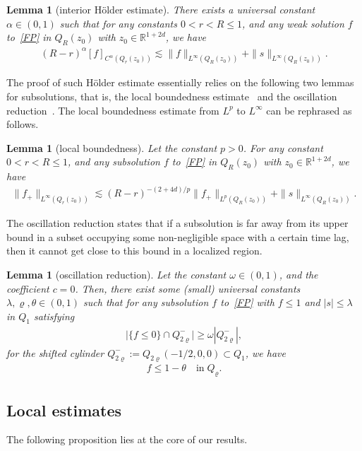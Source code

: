 \documentclass[10pt]{amsart}
\newtheorem{lemm}[theo]{Lemma}\newtheorem{prop}[theo]{Proposition}\newtheorem{coro}[theo]{Corollary}\newtheorem{conj}[theo]{Conjecture}
\theoremstyle{definition}\newtheorem{defi}[theo]{Definition}\newtheorem{rema}[theo]{Remark}\newtheorem{exam}[theo]{Example}\newtheorem{exem}[theo]{Example}\newtheorem{nota}[theo]{Notation}
\newcommand*\R {\mathbb{R}}
\begin{document}
\begin{lemm}[interior H\"older estimate]\label{interior}
There exists a universal constant $\alpha\in(0,1)$ such that for any constants $0<r<R\le1$, and any weak solution $f$ to~\eqref{FP} in $Q_R(z_0)$ with $z_0\in\R^{1+2d}$, we have
\begin{align*}
(R-r)^\alpha[f]_{C^\alpha(Q_r(z_0))}
\lesssim \|f\|_{L^\infty(Q_R(z_0))} +\|s\|_{L^\infty(Q_R(z_0))}.
\end{align*}
\end{lemm}

The proof of such H\"older estimate essentially relies on the following two lemmas for subsolutions, that is, the local boundedness estimate~\cite[Theorem~3.1]{GIMV} and the oscillation reduction~\cite[Lemma~4.5]{GIMV}. The local boundedness estimate from $L^p$ to $L^\infty$ can be rephrased as follows.
\begin{lemm}[local boundedness]\label{bdd}
Let the constant $p>0$. For any constant $0<r<R\le1$, and any subsolution $f$ to~\eqref{FP} in $Q_R(z_0)$ with $z_0\in\R^{1+2d}$, we have
\begin{align*}
\|f_+\|_{L^\infty(Q_r(z_0))}
\lesssim (R-r)^{-(2+4d)/p}\|f_+\|_{L^p(Q_R(z_0))} + \|s\|_{L^\infty(Q_R(z_0))}.
\end{align*}
\end{lemm}

The oscillation reduction states that if a subsolution is far away from its upper bound in a subset occupying some non-negligible space with a certain time lag, then it cannot get close to this bound in a localized region.

\begin{lemm}[oscillation reduction]\label{measure}
Let the constant $\omega\in(0,1)$, and the coefficient $c=0$. Then, there exist some (small) universal constants $\lambda,\varrho,\theta\in(0,1)$ such that for any subsolution $f$ to~\eqref{FP} with $f\le1$ and $|s|\le\lambda$ in $Q_1$ satisfying
\begin{align*}
\big|\{f\le 0\}\cap Q_{2\varrho}^-\big|\ge \omega
\left| Q_{2\varrho}^-\right|,
\end{align*}
for the shifted cylinder $Q_{2\varrho}^-:=Q_{2\varrho}\left(-1/2,0,0\right)\subset Q_1$, we have
\begin{align*}
f\le 1-\theta \quad\text{in}\; Q_\varrho.
\end{align*}
\end{lemm}

\subsection{Local estimates}\label{inflowproof}
The following proposition lies at the core of our results.
\end{document}
